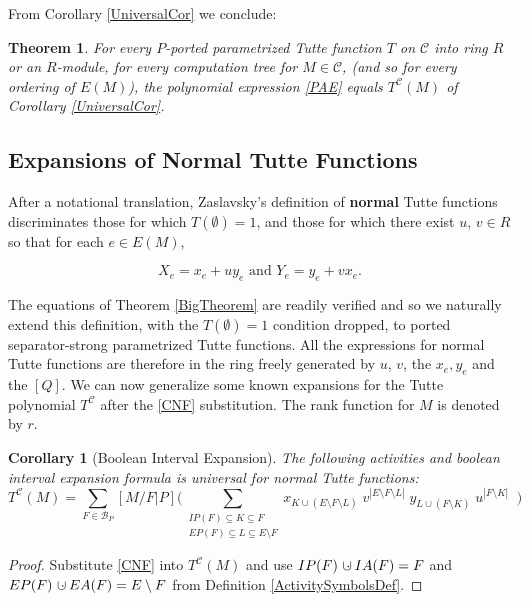 \documentclass[12pt,leqno]{amsart}
\newtheorem{cor}[lem]{Corollary}
\newtheorem{thm}[lem]{Theorem}
\theoremstyle{remark}
\newcommand{\dunion}
{\mbox{\hbox{\hskip6pt$\cdot$\hskip-5.50pt$\cup$\hskip2pt}}}
\newcommand{\Card}[1]{\ensuremath{{\left|#1\right|}}}
\begin{document}
From Corollary \ref{UniversalCor} we conclude:
\begin{thm}
\label{ActivitiesTheorem}
For every $P$-ported parametrized Tutte function $T$ 
on $\mathcal{C}$ into 
ring $R$ or an $R$-module,
for every computation tree for $M\in\mathcal{C}$,
(and so for every ordering of $E(M)$), 
the polynomial expression \eqref{PAE} equals 
$T^{\mathcal{C}}(M)$ of Corollary \ref{UniversalCor}.
\end{thm}


\subsection{Expansions of Normal Tutte Functions}
\label{NormalSubSec}
After a notational translation, 
Zaslavsky's \cite{MR93a:05047} definition of {\bf normal} Tutte 
functions discriminates
those for which $T(\emptyset)=1$, and those for which there exist
$u$, $v\in R$ so that for each $e\in E(M)$,

\begin{equation}
\tag{CNF}
\label{CNF}
X_e = x_e + uy_e \text{ and } Y_e = y_e + vx_e.
\end{equation}

The equations of
Theorem \ref{BigTheorem} are readily verified and
so we naturally extend this definition, with the
$T(\emptyset)=1$ condition dropped, to 
ported separator-strong parametrized Tutte functions.
All the expressions for normal Tutte
functions are therefore in the ring freely generated by
$u$, $v$, the $x_e, y_e$ and the $[Q]$.
We can now generalize some known 
expansions for the Tutte polynomial $T^{\mathcal{C}}$
after the \eqref{CNF} substitution.
The rank function for $M$ is denoted by $r$.


\begin{cor}[Boolean Interval Expansion]
\label{NormalActProp}
The following activities and boolean interval expansion formula
is universal for normal Tutte functions:
\[
T^{\mathcal{C}}(M)=
\sum_{F\in \mathcal{B}_P}[M/F|P]
\Big(
\sum_{\substack{
       IP(F)\subseteq K \subseteq F\\
       EP(F)\subseteq L \subseteq E\setminus F
      }}
 x_{K\cup (E\setminus F\setminus L)}\;
 v^{\Card{E\setminus F\setminus L}}\;
 y_{L\cup (F\setminus K)}\;
 u^{\Card{F\setminus K}}\;\;
\Big)
\]
\end{cor}

\begin{proof} 
Substitute 
\eqref{CNF} 
into $T^{\mathcal{C}}(M)$
and use
$IP(F)\dunion IA(F) =F$ and 
$EP(F)\dunion EA(F)=E\setminus F$
from
Definition \ref{ActivitySymbolsDef}.
\end{proof}
\end{document}
